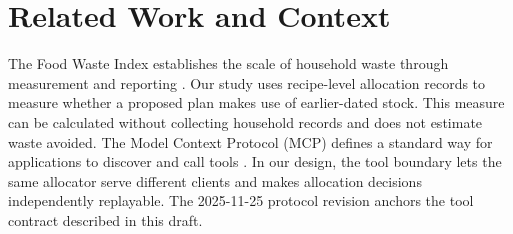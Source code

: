 \section{Related Work and Context}
The Food Waste Index establishes the scale of household waste through measurement and reporting \cite{unep}. Our study uses recipe-level allocation records to measure whether a proposed plan makes use of earlier-dated stock. This measure can be calculated without collecting household records and does not estimate waste avoided. The Model Context Protocol (MCP) defines a standard way for applications to discover and call tools \cite{mcp}. In our design, the tool boundary lets the same allocator serve different clients and makes allocation decisions independently replayable. The 2025-11-25 protocol revision anchors the tool contract described in this draft.
